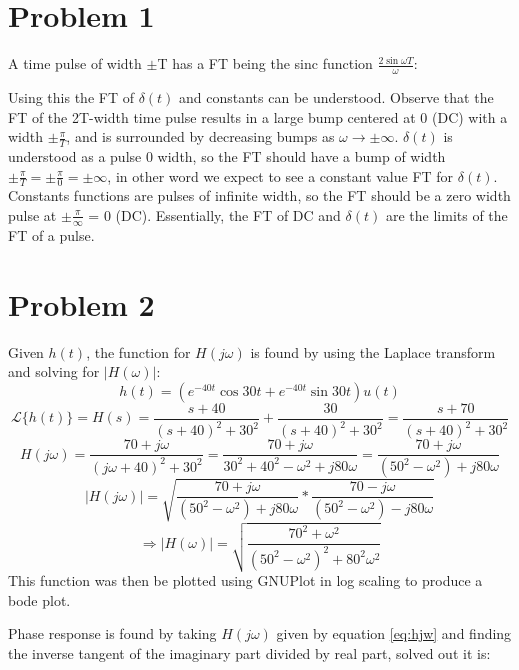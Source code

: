 \documentclass[12pt,letterpaper]{article}
\begin{document}
\section{Problem 1}
A time pulse of width $\pm$T has a FT being the sinc function $\frac{2 \sin \omega T}{\omega}$:
\FloatBarrier
\begin{figure}[h!]
\begin{center}
    	\resizebox{0.6\textwidth}{!}{}
\end{center}
\end{figure}
Using this the FT of  $\delta(t)$ and constants can be understood. Observe that the FT of the 2T-width time pulse results in a large bump centered at 0 (DC) with a width $\pm \frac{\pi}{T}$, and is surrounded by decreasing bumps as $\omega \rightarrow \pm \infty$. $\delta(t)$ is understood as a pulse 0 width, so the FT should have a bump of width  $\pm \frac{\pi}{T} = \pm \frac{\pi}{0} = \pm \infty$, in other word we expect to see a constant value FT for $\delta(t)$. Constants functions are pulses of infinite width, so the FT should be a zero width pulse at $\pm \frac{\pi}{\infty}$ = 0 (DC). Essentially, the FT of DC and $\delta (t)$ are the limits of the FT of a pulse.\\\par
\section{Problem 2}
Given $h(t)$, the function for $H(j\omega)$ is found by using the Laplace transform and solving for $\lvert H(\omega) \rvert$:
\begin{equation}
h(t) = (e^{-40t}\cos 30t + e^{-40t} \sin 30t)u(t)
\end{equation}
\begin{equation}
\mathcal{L}\{h(t)\} = H(s) = \frac{s+40}{(s+40)^2 + 30^2} + \frac{30}{(s+40)^2 + 30^2} = \frac{s+70}{(s+40)^2 + 30^2}
\end{equation}
\begin{equation}
H(j\omega) = \frac{70+j\omega}{(j\omega +40)^2 + 30^2} = \frac{70+j\omega}{30^2 + 40^2 -\omega^2 + j80\omega} = \frac{70+j\omega}{(50^2 - \omega ^2) + j80\omega}
\label{eq:hjw}
\end{equation}
\begin{equation}
\lvert H(j\omega)\rvert = \sqrt{\frac{70+j\omega}{(50^2 - \omega ^2) + j80\omega}*\frac{70-j\omega}{(50^2 - \omega ^2) - j80\omega}} 
\end{equation}
\begin{equation}
\Rightarrow \lvert H(\omega)\rvert  = \sqrt{\frac{70^2+\omega^2}{(50^2 - \omega ^2)^2+80^2\omega^2}}
\end{equation}
This function was then be plotted using GNUPlot in log scaling to produce a bode plot.
\FloatBarrier
\begin{figure}[h!]
\begin{center}
    	\resizebox{0.6\textwidth}{!}{}
\end{center}
\end{figure}
\FloatBarrier
Phase response is found by taking $H(j\omega)$ given by equation \ref{eq:hjw} and finding the inverse tangent of the imaginary part divided by real part, solved out it is:
\end{document}
